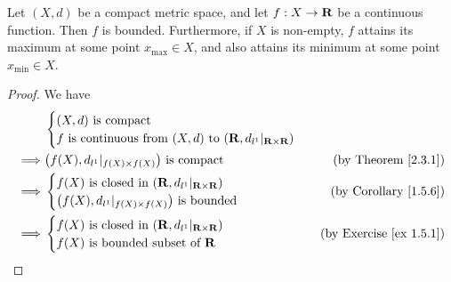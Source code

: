 \begin{proposition}\label{2.3.2}
    Let \((X, d)\) be a compact metric space, and let \(f : X \to \mathbf{R}\) be a continuous function.
    Then \(f\) is bounded.
    Furthermore, if \(X\) is non-empty, \(f\) attains its maximum at some point \(x_{\max} \in X\), and also attains its minimum at some point \(x_{\min} \in X\).
\end{proposition}

\begin{proof}
    We have
    \begin{align*}
                 & \begin{cases}
                       (X, d) \text{ is compact} \\
                       f \text{ is continuous from } (X, d) \text{ to } (\mathbf{R}, d_{l^1}|_{\mathbf{R} \times \mathbf{R}})
                   \end{cases}                                    \\
        \implies & \big(f(X), d_{l^1}|_{f(X) \times f(X)}\big) \text{ is compact}                 & \text{(by Theorem \ref{2.3.1})} \\
        \implies & \begin{cases}
                       f(X) \text{ is closed in } (\mathbf{R}, d_{l^1}|_{\mathbf{R} \times \mathbf{R}}) \\
                       \big(f(X), d_{l^1}|_{f(X) \times f(X)}\big) \text{ is bounded}
                   \end{cases}                 & \text{(by Corollary \ref{1.5.6})}                                                  \\
        \implies & \begin{cases}
                       f(X) \text{ is closed in } (\mathbf{R}, d_{l^1}|_{\mathbf{R} \times \mathbf{R}}) \\
                       f(X) \text{ is bounded subset of } \mathbf{R}
                   \end{cases}                    & \text{(by Exercise \ref{ex 1.5.1})}
    \end{align*}


\end{proof}
